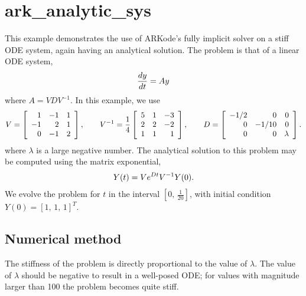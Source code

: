 \documentclass[letterpaper,10pt,english]{sphinxmanual}
\begin{document}
\section{ark\_analytic\_sys}
\label{cpp_serial:ark-analytic-sys}\label{cpp_serial:id1}
This example demonstrates the use of ARKode's fully implicit solver on
a stiff ODE system, again having an analytical solution.  The problem
is that of a linear ODE system,
\begin{gather}
\begin{split}\frac{dy}{dt} = Ay\end{split}\notag
\end{gather}
where $A = V D V^{-1}$.  In this example, we use
\begin{gather}
\begin{split}V = \left[\begin{array}{rrr} 1 & -1 & 1\\ -1 & 2 & 1\\ 0 & -1 & 2
    \end{array}\right], \qquad
V^{-1} = \frac14 \left[\begin{array}{rrr} 5 & 1 & -3\\ 2 & 2 & -2\\
    1 & 1 & 1 \end{array}\right], \qquad
D = \left[\begin{array}{rrr} -1/2 & 0 & 0\\ 0 & -1/10 & 0\\ 0 & 0 &
    \lambda \end{array}\right].\end{split}\notag
\end{gather}
where $\lambda$ is a large negative number. The analytical
solution to this problem may be computed using the matrix exponential,
\begin{gather}
\begin{split}Y(t) = V e^{Dt} V^{-1} Y(0).\end{split}\notag
\end{gather}
We evolve the problem for $t$ in the interval $\left[0,\,
\frac{1}{20}\right]$, with initial condition $Y(0) = \left[1,\,
1,\, 1\right]^T$.


\subsection{Numerical method}
\label{cpp_serial:numerical-method}
The stiffness of the problem is directly proportional to the
value of $\lambda$.  The value of $\lambda$ should be
negative to result in a well-posed ODE; for values with magnitude
larger than 100 the problem becomes quite stiff.
\end{document}
